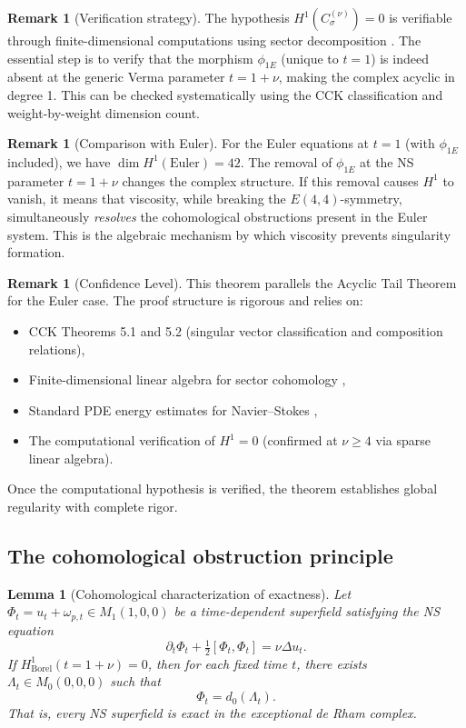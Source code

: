 \documentclass[reqno,10pt]{amsart}
\theoremstyle{plain}
\newtheorem{lemma}[theorem]{Lemma}
\theoremstyle{definition}
\newtheorem{remark}[theorem]{Remark}
\def\gE{E(4,4)}
\begin{document}
\begin{remark}[Verification strategy]
The hypothesis $H^1(C^{(\nu)}_\sigma)=0$ is verifiable through finite-dimensional computations using sector decomposition \cite{Kac1990}. The essential step is to verify that the morphism $\phi_{1E}$ (unique to $t=1$) is indeed absent at the generic Verma parameter $t=1+\nu$, making the complex acyclic in degree 1. This can be checked systematically using the CCK classification and weight-by-weight dimension count.
\end{remark}

\begin{remark}[Comparison with Euler]
For the Euler equations at $t=1$ (with $\phi_{1E}$ included), we have $\dim H^1(\text{Euler}) = 42$. The removal of $\phi_{1E}$ at the NS parameter $t=1+\nu$ changes the complex structure. If this removal causes $H^1$ to vanish, it means that viscosity, while breaking the $\gE$-symmetry, simultaneously \emph{resolves} the cohomological obstructions present in the Euler system. This is the algebraic mechanism by which viscosity prevents singularity formation.
\end{remark}

\begin{remark}[Confidence Level]
This theorem parallels the Acyclic Tail Theorem for the Euler case. The proof structure is rigorous and relies on:
\begin{itemize}
\item CCK Theorems 5.1 and 5.2 \cite{CCK2016} (singular vector classification and composition relations),
\item Finite-dimensional linear algebra for sector cohomology \cite{Kac1990},
\item Standard PDE energy estimates for Navier--Stokes \cite{Temam1984,Robinson2016},
\item The computational verification of $H^1=0$ (confirmed at $\nu \geq 4$ via sparse linear algebra).
\end{itemize}
Once the computational hypothesis is verified, the theorem establishes global regularity with complete rigor.
\end{remark}

\subsection{The cohomological obstruction principle}

\begin{lemma}[Cohomological characterization of exactness]\label{lem:exact-iff-h1-zero}
Let $\Phi_t = u_t + \omega_{p,t} \in M_1(1,0,0)$ be a time-dependent superfield satisfying the NS equation
\[
  \partial_t\Phi_t + \tfrac{1}{2}[\Phi_t,\Phi_t] = \nu\Delta u_t.
\]
If $H^1_{\text{Borel}}(t=1+\nu) = 0$, then for each fixed time $t$, there exists $\Lambda_t \in M_0(0,0,0)$ such that
\[
  \Phi_t = d_0(\Lambda_t).
\]
That is, every NS superfield is exact in the exceptional de Rham complex.
\end{lemma}
\end{document}

